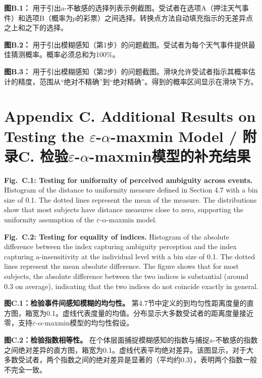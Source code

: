 \documentclass[12pt,a4paper]{article}
\newenvironment{original}
  {\par\medskip\noindent\color{black}\ignorespaces}
  {\par\medskip}
\newenvironment{translation}
  {\par\noindent\color{transblue}\ignorespaces}
  {\par\medskip\medskip}
\begin{document}
\begin{translation}
\textbf{图B.1：} 用于引出a-不敏感的选择列表示例截图。受试者在选项A（押注天气事件）和选项B（概率为$p$的彩票）之间选择。转换点方法自动填充指示的无差异点之上和之下的选择。

\textbf{图B.2：} 用于引出模糊感知（第1步）的问题截图。受试者为每个天气事件提供最佳猜测概率。概率必须总和为100\%。

\textbf{图B.3：} 用于引出模糊感知（第2步）的问题截图。滑块允许受试者指示其概率估计的精度，范围从``绝对不精确''到``绝对精确''。得到的概率区间显示在滑块下方。
\end{translation}

\newpage
\section*{Appendix C. Additional Results on Testing the \texorpdfstring{$\varepsilon$-$\alpha$}{epsilon-alpha}-maxmin Model / 附录C. 检验\texorpdfstring{$\varepsilon$-$\alpha$}{epsilon-alpha}-maxmin模型的补充结果}

\begin{original}
\textbf{Fig.\ C.1: Testing for uniformity of perceived ambiguity across events.} Histogram of the distance to uniformity measure defined in Section 4.7 with a bin size of 0.1. The dotted lines represent the mean of the measure. The distributions show that most subjects have distance measures close to zero, supporting the uniformity assumption of the $\varepsilon$-$\alpha$-maxmin model.

\textbf{Fig.\ C.2: Testing for equality of indices.} Histogram of the absolute difference between the index capturing ambiguity perception and the index capturing a-insensitivity at the individual level with a bin size of 0.1. The dotted lines represent the mean absolute difference. The figure shows that for most subjects, the absolute difference between the two indices is substantial (around 0.3 on average), indicating that the two indices do not coincide exactly in general.
\end{original}

\begin{translation}
\textbf{图C.1：检验事件间感知模糊的均匀性。} 第4.7节中定义的到均匀性距离度量的直方图，箱宽为0.1。虚线代表度量的均值。分布显示大多数受试者的距离度量接近零，支持$\varepsilon$-$\alpha$-maxmin模型的均匀性假设。

\textbf{图C.2：检验指数相等性。} 在个体层面捕捉模糊感知的指数与捕捉a-不敏感的指数之间绝对差异的直方图，箱宽为0.1。虚线代表平均绝对差异。该图显示，对于大多数受试者，两个指数之间的绝对差异是显著的（平均约0.3），表明两个指数一般不完全一致。
\end{translation}
\end{document}
